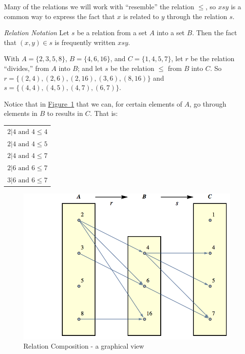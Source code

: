 \documentclass[10pt,]{book}
\theoremstyle{plain}
\theoremstyle{definition}
\theoremstyle{definition}
\theoremstyle{definition}
\theoremstyle{definition}
\begin{document}
\par
Many of the relations we will work with ``resemble'' the relation \(\leq\), so \(x s y\) is a common way to express the fact that \(x\) is related to \(y\) through the relation \(s\).%
\par
\emph{Relation Notation} Let \(s\) be a relation from a set \(A\) into a set \(B\). Then the fact that \((x, y) \in s\) is frequently
written \(x s y\).\label{notation-2}
%
\par
With \(A = \{2, 3, 5, 8\}\), \(B = \{4, 6, 16\}\), and \(C = \{1, 4, 5, 7\}\), let \(r\) be the relation ``divides,''
from \(A\) into \(B\); and let \(s\) be the relation \(\leq\) from \(B\) into \(C\). So \(r = \{(2, 4), (2, 6), (2,16), (3, 6), (8, 16)\}\) and \(s = \{(4, 4), (4, 5), (4, 7), (6, 7)\}\).%
\par
Notice that in \hyperref[graph-6-1-relation-composition]{Figure~\ref{graph-6-1-relation-composition}} that we can, for certain elements of \(A\), go through elements in \(B\) to results in \(C\). That is:%
\leavevmode%
\begin{table}
\centering
\begin{tabular}{c}
\(2 | 4 \textrm{ and } 4 \leq  4\)\tabularnewline[0pt]
\(2 | 4 \textrm{ and } 4 \leq  5\)\tabularnewline[0pt]
\(2 | 4 \textrm{ and } 4 \leq  7\)\tabularnewline[0pt]
\(2| 6 \textrm{ and } 6 \leq 7\)\tabularnewline[0pt]
\(3| 6 \textrm{ and } 6 \leq  7\)
\end{tabular}
\end{table}
\leavevmode%
\begin{figure}
\centering
\includegraphics[width=1\linewidth]{images/graph-6-1-relation-composition.png}
\caption{Relation Composition - a graphical view\label{graph-6-1-relation-composition}}
\end{figure}
\end{document}
